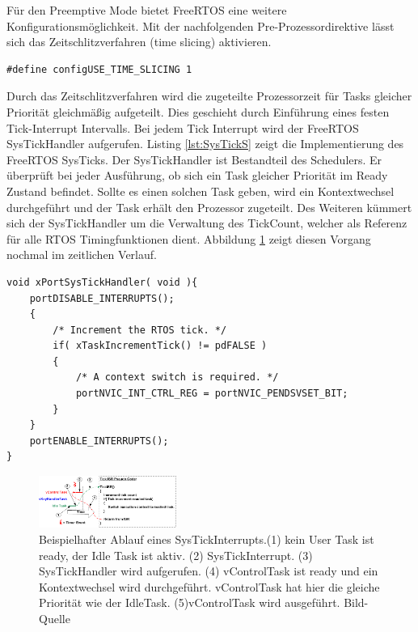 Für den Preemptive Mode bietet FreeRTOS eine weitere Konfigurationsmöglichkeit. Mit der nachfolgenden Pre-Prozessordirektive lässt sich das Zeitschlitzverfahren (time slicing) aktivieren. 
\begin{lstlisting}[numbers = none]
#define configUSE_TIME_SLICING 1
\end{lstlisting}
Durch das Zeitschlitzverfahren wird die zugeteilte Prozessorzeit für Tasks gleicher Priorität gleichmäßig aufgeteilt. Dies geschieht durch Ein\-füh\-rung eines festen Tick-Interrupt Intervalls. Bei jedem Tick Interrupt wird der FreeRTOS SysTickHandler aufgerufen. Listing \ref{lst:SysTickS} zeigt die Implementierung des FreeRTOS SysTicks. Der SysTickHandler ist Bestandteil des Schedulers. Er überprüft bei jeder Ausführung, ob sich ein Task gleicher Priorität im Ready Zustand befindet. Sollte es einen solchen Task geben, wird ein Kontextwechsel durchgeführt und der Task erhält den Prozessor zugeteilt. Des Weiteren kümmert sich der SysTickHandler um die Verwaltung des TickCount, welcher als Referenz für alle RTOS Timingfunktionen dient. Abbildung \ref{fig:SysTick} zeigt diesen Vorgang nochmal im zeitlichen Verlauf. 
\begin{lstlisting}[caption={FreeRTOS Source des SysTickHandlers aus Task.c. Der SysTickHandler verwaltet den TickCount. Der TickCount dient allen Timingfunktionen des RTOS Kernels als Zeitreferenz. Des Weiteren wird beim aktiven Time Slicing überprüft ob ein Kontextwechsel nötig ist. Der Kontextwechsel wird dann ggf. durch den PendSVHandler durchgeführt.}, linewidth=8cm,captionpos=b, label=lst:SysTickS, float=hbt]
void xPortSysTickHandler( void ){
	portDISABLE_INTERRUPTS();
	{
		/* Increment the RTOS tick. */
		if( xTaskIncrementTick() != pdFALSE )
		{
			/* A context switch is required. */
			portNVIC_INT_CTRL_REG = portNVIC_PENDSVSET_BIT;
		}
	}
	portENABLE_INTERRUPTS();
}
\end{lstlisting}
\begin{figure}[htb]
	\centering
		\includegraphics[width=0.4\textwidth]{Pictures/FreeRTOSOrg/TickISR.png}
	\caption{Beispielhafter Ablauf eines SysTickInterrupts.(1) kein User Task ist ready, der Idle Task ist aktiv. (2) SysTickInterrupt. (3) SysTickHandler wird aufgerufen. (4) vControlTask ist ready und ein Kontextwechsel wird durchgeführt. vControlTask hat hier die gleiche Priorität wie der IdleTask. (5)vControlTask wird ausgeführt. Bild-Quelle~\protect{}}
	\label{fig:SysTick}
\end{figure}

